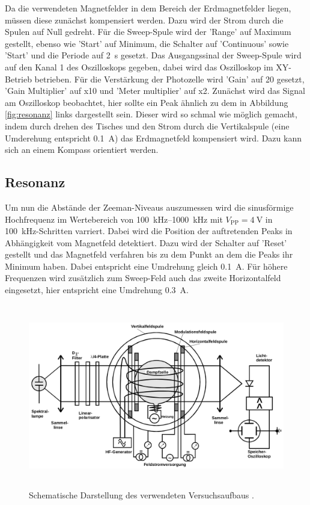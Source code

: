 Da die verwendeten Magnetfelder in dem Bereich der Erdmagnetfelder liegen, müssen diese zunächst kompensiert werden. Dazu wird der 
Strom durch die Spulen auf Null gedreht. Für die Sweep-Spule wird der 'Range' auf Maximum gestellt, ebenso wie 'Start' auf Minimum,
die Schalter auf 'Continuous' sowie 'Start' und die Periode auf \SI{2}{\second} gesetzt. Das Ausgangssinal der Sweep-Spule wird auf den 
Kanal 1 des Oszilloskops gegeben, dabei wird das Oszilloskop im XY-Betrieb betrieben. Für die Verstärkung der Photozelle wird 
'Gain' auf \num{20} gesetzt, 'Gain Multiplier' auf x\num{10} und 'Meter multiplier' auf x\num{2}.
Zunächst wird das Signal am Oszilloskop beobachtet, hier sollte ein Peak ähnlich zu dem in Abbildung \ref{fig:resonanz} links dargestellt 
sein. Dieser wird so schmal wie möglich gemacht, indem durch drehen des Tisches und den Strom durch die Vertikalspule (eine Umderehung
entspricht \SI{0.1}{\ampere}) das Erdmagnetfeld kompensiert wird. Dazu kann sich an einem Kompass orientiert werden.

\subsection{Resonanz}
\label{sec:resonanz}
Um nun die Abstände der Zeeman-Niveaus auszumessen wird die sinusförmige Hochfrequenz im Wertebereich von \SIrange{100}{1000}{\kilo\hertz} 
mit $V_\text{PP} = \SI{4}{\volt}$ in \SI{100}{\kilo\hertz}-Schritten varriert.
Dabei wird die Position der auftretenden Peaks in Abhängigkeit vom Magnetfeld detektiert. Dazu wird der Schalter auf 'Reset' gestellt 
und das Magnetfeld verfahren bis zu dem Punkt an dem die Peaks ihr Minimum haben. Dabei entspricht eine Umdrehung gleich \SI{0.1}{\ampere}.
Für höhere Frequenzen wird zusätzlich zum Sweep-Feld auch das zweite Horizontalfeld eingesetzt, hier entspricht eine Umdrehung 
\SI{0.3}{\ampere}.

\begin{figure}
  \centering
  \includegraphics[height=8.0cm]{content/pictures/Aufbau.png}
  \caption{Schematische Darstellung des verwendeten Versuchsaufbaus \cite{anleitung}.}
  \label{fig:aufbau}
\end{figure}

\FloatBarrier